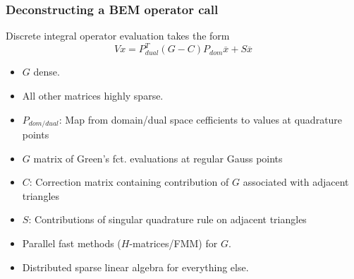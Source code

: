 \documentclass[dvipsnames,10pt]{beamer}
\begin{document}
\begin{frame}
\frametitle{Deconstructing a BEM operator call}

\begin{minipage}{5cm}
\begin{tcolorbox}
\small
Discrete integral operator evaluation takes the form
$$
Vx = P_{dual}^T(G - C)P_{dom}\overline{x} + S\overline{x}
$$

\begin{itemize}
\item $G$ dense.
\item All other matrices highly sparse.
\end{itemize}
\end{tcolorbox}

\end{minipage}
\begin{minipage}{5cm}
\small
\begin{itemize}
\item $P_{dom/dual}$: Map from domain/dual space cefficients to values at quadrature points
\item $G$ matrix of Green's fct. evaluations at regular Gauss points
\item $C$: Correction matrix containing contribution of $G$ associated with adjacent triangles
\item $S$: Contributions of singular quadrature rule on adjacent triangles
\end{itemize}
\end{minipage}

\vspace{\baselineskip}

\begin{itemize}
\item Parallel fast methods ($H$-matrices/FMM) for $G$.
\item Distributed sparse linear algebra for everything else.
\end{itemize}

\end{frame}
\end{document}
